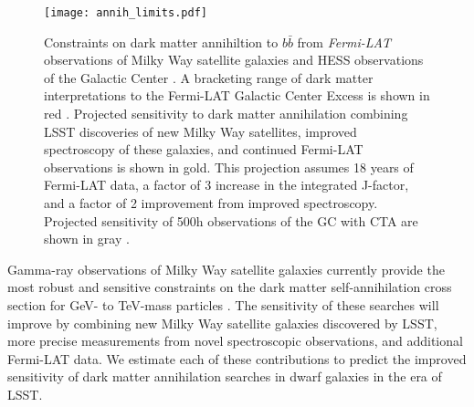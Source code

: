 \begin{figure}[t]
\centering
\texttt{[image: annih\_limits.pdf]}
\caption{Constraints on dark matter annihiltion to $b\bar{b}$ from {\it Fermi-LAT} observations of Milky Way satellite galaxies \citep[LAT Dwarfs;][]{} and HESS observations of the Galactic Center \citep[HESS GC;][]{1607.08142}. 
A bracketing range of dark matter interpretations to the  Fermi-LAT Galactic Center Excess is shown in red \citep[GCE;][]{1402.6703, Gordon:2013, Abazajian:2014}.
Projected sensitivity to dark matter annihilation combining LSST discoveries of new Milky Way satellites, improved spectroscopy of these galaxies, and continued Fermi-LAT observations is shown in gold. This projection assumes 18 years of Fermi-LAT data, a factor of 3 increase in the integrated J-factor, and a factor of 2 improvement from improved spectroscopy. 
Projected sensitivity of 500h observations of the GC with CTA are shown in gray \citep[CTA GC;][]{Zaharijas:prep}.
\label{fig:indirect}
}
\end{figure}

Gamma-ray observations of Milky Way satellite galaxies currently provide the most robust and sensitive constraints on the dark matter self-annihilation cross section for GeV- to TeV-mass particles \citep[\eg][]{Ackermann:2014, Geringer-Sameth:2015, Ackermann:2015, 1812.06986}.
The sensitivity of these searches will improve by combining new Milky Way satellite galaxies discovered by LSST, more precise \Jfactor measurements from novel spectroscopic observations, and additional Fermi-LAT data. 
We estimate each of these contributions to predict the improved sensitivity of dark matter annihilation searches in dwarf galaxies in the era of LSST.

